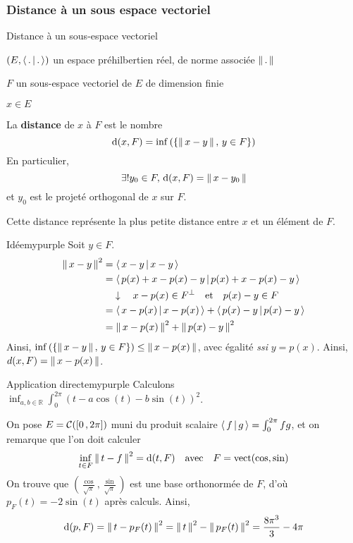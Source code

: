         \subsubsection{Distance à un sous espace vectoriel}

        \begin{defitheo}{Distance à un sous-espace vectoriel}{}
            \begin{soient}
                \item $(E,\left<\,.\,\middle|\,.\,\right>)$ un espace préhilbertien réel, de norme associée $\left\lVert \,. \, \right\rVert$
                \item $F$ un sous-espace vectoriel de $E$ de dimension finie
                \item $x \in E$
            \end{soient}
            La \textbf{distance} de $x$ à $F$ est le nombre 
            \[ \operatorname{d}(x,F)=\inf\left(\left\{\left\lVert \,x-y \, \right\rVert, \, y \in F\right\}\right) \]
            En particulier, 
            \[ \exists ! y_0 \in F, \, \operatorname{d}(x,F) = \left\lVert \,x - y_0 \, \right\rVert \] 
            et $y_0$ est le projeté orthogonal de $x$ sur $F$.
        \end{defitheo}

        Cette distance représente la plus petite distance entre $x$ et un élément de $F$. 

        \begin{demo}{Idée}{mypurple}
            Soit $y \in F$.
            \begin{align*}
                \left\lVert \,x - y \, \right\rVert^2 
                &= \left<\,x - y\,\middle|\,x-y\,\right> \\
                &= \left<\,p(x) + x - p(x) - y\,\middle|\,p(x) + x - p(x) - y\,\right> \\
                &\quad \downarrow \quad x - p(x) \in F^{\perp} \quad \text{et} \quad p(x) - y \in F \\
                &= \left<\,x - p(x)\,\middle|\,x - p(x)\,\right> + \left<\,p(x) - y\,\middle|\,p(x) - y\,\right> \\
                &= \left\lVert \,x - p(x) \, \right\rVert^2 + \left\lVert \,p(x) - y \, \right\rVert^2
            \end{align*} 
            Ainsi, $\inf\left(\left\{\left\lVert \,x-y \, \right\rVert, \, y \in F\right\}\right) \leq \left\lVert \,x - p(x) \, \right\rVert$, avec égalité \textit{ssi} $y = p(x)$. Ainsi, $d(x,F) = \left\lVert \,x - p(x) \, \right\rVert$.
        \end{demo}

        \begin{omed}{Application directe}{mypurple}
            Calculons $\inf_{a,b \in \mathbb{R}} \int_{0}^{2\pi} \left(t - a \cos(t) - b \sin(t)\right)^2$.

            On pose $E = \mathcal{C}(\left[ 0 \, , 2\pi \right])$ muni du produit scalaire $\left<\,f\,\middle|\,g\,\right> = \int_{0}^{2\pi} fg$, et on remarque que l’on doit calculer 
            \[ \inf_{t \in F} \left\lVert \,t - f \, \right\rVert^2 = \operatorname{d}(t,F) \quad \text{avec} \quad F = \operatorname{vect}(\cos, \sin) \]   
            On trouve que $\left(\frac{\cos}{\sqrt{\pi}}, \frac{\sin}{\sqrt{\pi}}\right)$ est une base orthonormée de $F$, d’où $p_F(t) = - 2\sin(t)$ après calculs. Ainsi, 
            \[ \operatorname{d}(p,F) = \left\lVert \,t - p_F(t) \, \right\rVert^2 = \left\lVert \,t \, \right\rVert^2 - \left\lVert \,p_F(t) \, \right\rVert^2 = \frac{8 \pi^3}{3} - 4\pi \]   
        \end{omed}


